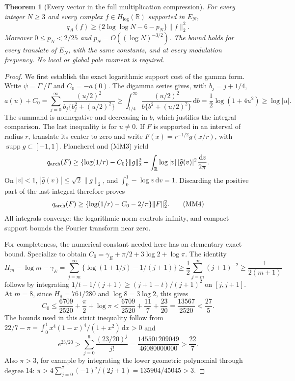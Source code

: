 \documentclass[11pt]{article}
\newtheorem{theorem}{Theorem}
\theoremstyle{remark}\newtheorem{remark}[theorem]{Remark}
\newcommand{\R}{\mathbb R}
\newcommand{\dd}{\,\mathrm d}
\begin{document}
\begin{theorem}[Every vector in the full multiplication compression]
\label{thm:full-multiplication-mesh}
For every integer $N\ge3$ and every complex $f\in H_{\log}(\R)$
supported in $E_N$,
\[
 q_A(f)\ge\{2\log\log N-6-p_N\}\|f\|_2^2. \tag{MM2}
\]
Moreover $0\le p_N<2/25$ and $p_N=O((\log N)^{-3/2})$.
The bound holds for every translate of $E_N$, with the same constants,
and at every modulation frequency. No local or global pole moment
is required.
\end{theorem}
\begin{proof}
We first establish the exact logarithmic support cost of the gamma
form. Write $\psi=\Gamma'/\Gamma$ and $C_0=-a(0)$.
The digamma series \cite[eq.~(5.7.6), away from the poles]{DLMFGamma}
gives, with $b_j=j+1/4$,
\[
 a(u)+C_0=\sum_{j=0}^{\infty}
     \frac{(u/2)^2}{b_j\{b_j^2+(u/2)^2\}}
 \ge\int_{1/4}^{\infty}
     \frac{(u/2)^2}{b\{b^2+(u/2)^2\}}\dd b
 =\frac12\log(1+4u^2)\ge\log|u|. \tag{MM3}
\]
The summand is nonnegative and decreasing in $b$, which justifies
the integral comparison. The last inequality is for $u\ne0$.
If $F$ is supported in an interval of radius $r$, translate its
center to zero and write $F(x)=r^{-1/2}g(x/r)$, with
$\operatorname{supp}g\subset[-1,1]$. Plancherel and (MM3) yield
\[
 q_{\rm arch}(F)\ge
 \{\log(1/r)-C_0\}\|g\|_2^2+
       \int_\R\log|v|\,|\widehat g(v)|^2\frac{\dd v}{2\pi}.
\]
On $|v|<1$, $|\widehat g(v)|\le\sqrt2\|g\|_2$, and
$\int_0^1-\log v\dd v=1$. Discarding the positive part of the
last integral therefore proves
\[
 q_{\rm arch}(F)\ge
       \{\log(1/r)-C_0-2/\pi\}\|F\|_2^2. \tag{MM4}
\]
All integrals converge: the logarithmic norm controls infinity,
and compact support bounds the Fourier transform near zero.

For completeness, the numerical constant needed here has an
elementary exact bound. Specialize
\cite[eq.~(5.4.19), $p=1,q=4$]{DLMFGamma} to obtain
$C_0=\gamma_E+\pi/2+3\log2+\log\pi$. The identity
\[
 H_m-\log m-\gamma_E
 =\sum_{j=m}^{\infty}
       \{\log(1+1/j)-1/(j+1)\}
 \ge\frac12\sum_{j=m}^{\infty}(j+1)^{-2}
 \ge\frac1{2(m+1)}
\]
follows by integrating
$1/t-1/(j+1)\ge(j+1-t)/(j+1)^2$ on $[j,j+1]$.
At $m=8$, since $H_8=761/280$ and $\log8=3\log2$, this gives
\[
 C_0\le\frac{6709}{2520}+\frac\pi2+\log\pi
 <\frac{6709}{2520}+\frac{11}7+\frac{23}{20}
 =\frac{13567}{2520}<\frac{27}5. \tag{MM5}
\]
The bounds used in this strict inequality follow from
$22/7-\pi=\int_0^1x^4(1-x)^4/(1+x^2)\dd x>0$ and
\[
 e^{23/20}>\sum_{j=0}^{6}\frac{(23/20)^j}{j!}
 =\frac{145501209049}{46080000000}>\frac{22}7.
\]
Also $\pi>3$, for example by integrating the lower geometric
polynomial through degree $14$:
$\pi>4\sum_{j=0}^7(-1)^j/(2j+1)=135904/45045>3$.


\end{proof}
\end{document}
